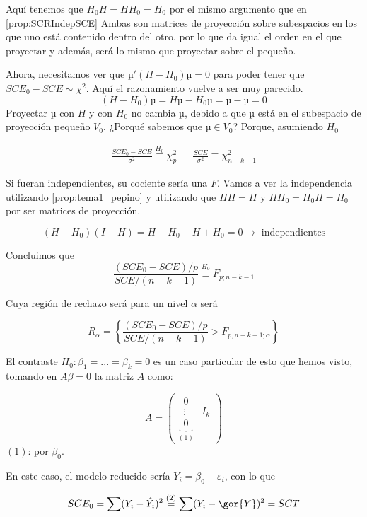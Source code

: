 Aquí tenemos que  $H_0H = HH_0 = H_0$ por el mismo argumento que en \ref{prop:SCRIndepSCE} Ambas son matrices de proyección sobre subespacios en los que uno está contenido dentro del otro, por lo que da igual el orden en el que proyectar y además, será lo mismo que proyectar sobre el pequeño.

Ahora, necesitamos ver que $µ'(H-H_0)µ = 0$ para poder tener que $SCE_0 - SCE \sim \chi^2$. Aquí el razonamiento vuelve a ser muy parecido.
\[(H-H_0)µ = Hµ - H_0µ = µ-µ = 0\]
Proyectar $µ$ con $H$ y con $H_0$ no cambia $µ$, debido a que $µ$ está en el subespacio de proyección pequeño $V_0$. ¿Porqué sabemos que $µ∈V_0$? Porque, asumiendo $H_0$

\[
\begin{array}{lcr} \displaystyle\frac{SCE_0 - SCE}{σ^2} \overset{H_0}{\equiv} \chi^2_{p} && \displaystyle\frac{SCE}{σ^2} \equiv \chi^2_{n-k-1}\end{array}
\]

Si fueran independientes, su cociente sería una $F$. Vamos a ver la independencia utilizando \ref{prop:tema1_pepino} y utilizando que $HH = H$ y $HH_0 = H_0H = H_0$ por ser matrices de proyección.

\[(H-H_0)(I-H) = H-H_0 - H + H_0 = 0\to \text{ independientes}\]

Concluimos que
\[
\frac{(SCE_0-SCE)/p}{SCE/(n-k-1)} \overset{H_0}{\equiv} F_{p;n-k-1}
\]

Cuya región de rechazo será para un nivel $α$ será

\[
R_α = \left\{\frac{(SCE_0-SCE)/p}{SCE/(n-k-1)} > F_{p,n-k-1;α} \right\}
\]

\obs El contraste $H_0: β_1 = ... = β_k = 0$ es un caso particular de esto que hemos visto, tomando en $Aβ = 0$ la matriz $A$ como:

\[A =
\begin{pmatrix}
	\underbrace{\begin{matrix}0\\\vdots\\0\end{matrix}}_{(1)}  &
	I_k
\end{pmatrix}
\]
$(1)$: por $β_0$.

En este caso, el modelo reducido sería $Y_i = β_0 + ε_i$, con lo que

\[SCE_0 = \sum (Y_i-\hat{Y_i})^2 \overset{(2)}{=} \sum(Y_i - \gor{Y})^2=SCT\]


